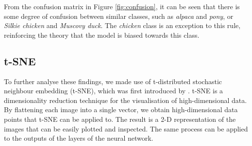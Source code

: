 \documentclass{l4proj}
\begin{document}
From the confusion matrix in Figure \ref{fig:confusion}, it can be seen that there is some degree of confusion between similar classes, such as \textit{alpaca} and \textit{pony}, or \textit{Silkie chicken} and \textit{Muscovy duck}. The \textit{chicken} class is an exception to this rule, reinforcing the theory that the model is biased towards this class.

\subsection{t-SNE}
\label{tsne}

To further analyse these findings, we made use of t-distributed stochastic neighbour embedding (t-SNE), which was first introduced by \citet{maaten_visualizing_2008}. t-SNE is a dimensionality reduction technique for the visualisation of high-dimensional data. By flattening each image into a single vector, we obtain high-dimensional data points that t-SNE can be applied to. The result is a 2-D representation of the images that can be easily plotted and inspected. The same process can be applied to the outputs of the layers of the neural network.
\end{document}
